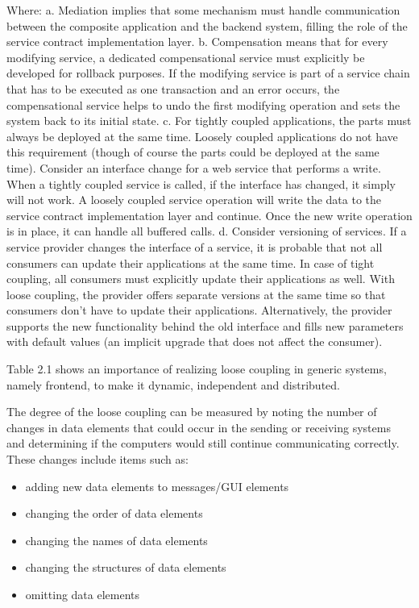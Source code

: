 Where: 
\newline
a. Mediation implies that some mechanism must handle communication between the composite application and the backend system, filling the role of the service contract implementation layer.
\newline
b. Compensation means that for every modifying service, a dedicated compensational service must explicitly be developed for rollback purposes. If the modifying service is part of a service chain that has to be executed as one transaction and an error occurs, the compensational service helps to undo the first modifying operation and sets the system back to its initial state. 
\newline
c. For tightly coupled applications, the parts must always be deployed at the same time. Loosely coupled applications do not have this requirement (though of course the parts could be deployed at the same time). Consider an interface change for a web service that performs a write. When a tightly coupled service is called, if the interface has changed, it simply will not work. A loosely coupled service operation will write the data to the service contract implementation layer and continue. Once the new write operation is in place, it can handle all buffered calls. 
\newline
d. Consider versioning of services. If a service provider changes the interface of a service, it is probable that not all consumers can update their applications at the same time. In case of tight coupling, all consumers must explicitly update their applications as well. With loose coupling, the provider offers separate versions at the same time so that consumers don't have to update their applications. Alternatively, the provider supports the new functionality behind the old interface and fills new parameters with default values (an implicit upgrade that does not affect the consumer).

Table 2.1 shows an importance of realizing loose coupling in generic systems, namely frontend, to make it dynamic, independent and distributed.

The degree of the loose coupling can be measured by noting the number of changes in data elements that could occur in the sending or receiving systems and determining if the computers would still continue communicating correctly\cite{firestone1984study,danneels2003tight}. These changes include items such as:
\begin{itemize}
\item adding new data elements to messages/GUI elements
\item changing the order of data elements
\item changing the names of data elements
\item changing the structures of data elements
\item omitting data elements
\end{itemize}

